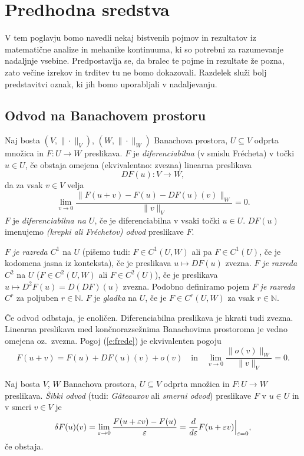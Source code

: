 \chapter{Predhodna sredstva}


V tem poglavju bomo navedli nekaj bistvenih pojmov in rezultatov iz matematične analize
in mehanike kontinuuma, ki so potrebni za razumevanje nadaljnje vsebine. Predpostavlja
se, da bralec te pojme in rezultate že pozna, zato večine izrekov in trditev
tu ne bomo dokazovali. Razdelek služi bolj predstavitvi oznak, ki jih
bomo uporabljali v nadaljevanju.


\section{Odvod na Banachovem prostoru}


\begin{definicija}
	Naj bosta $(V,\|\cdot\|_V)$, $(W,\|\cdot\|_W)$ Banachova prostora, $U\subseteq V$ odprta
	množica in $F\colon U\to W$ preslikava. $F$ je \emph{diferenciabilna} (v smislu Frécheta)
	v točki $u\in U$, če obstaja omejena (ekvivalentno: zvezna) linearna preslikava
	\[ DF(u)\colon V\to W, \]
	da za vsak $v\in V$ velja
	\begin{equation} \label{e:frede}
		\lim_{v\to 0}\frac{\|F(u+v)-F(u)-DF(u)(v)\|_W}{\|v\|_V}=0.
	\end{equation}
	$F$ je \emph{diferenciabilna na $U$}, če je diferenciabilna v vsaki točki $u\in U$.
	$DF(u)$ imenujemo \emph{(krepki ali Fréchetov) odvod} preslikave $F$.
	
	$F$ \emph{je razreda $C^1$} na $U$ (pišemo tudi: $F\in C^1(U,W)$ ali pa $F\in C^1(U)$,
	če je kodomena jasna iz konteksta), če je preslikava $u\mapsto DF(u)$ zvezna.
	$F$ \emph{je razreda $C^2$} na $U$ ($F\in C^2(U,W)$ ali $F\in C^2(U)$),
	če je preslikava $u\mapsto D^2F(u)=D(DF)(u)$ zvezna. Podobno definiramo pojem
	$F$ \emph{je razreda $C^r$} za poljuben $r\in\mathbb{N}$. $F$ je \emph{gladka} na $U$,
	če je $F\in C^r(U,W)$ za vsak $r\in\mathbb{N}$.
\end{definicija}

Če odvod odbstaja, je enoličen. Diferenciabilna preslikava je hkrati tudi zvezna.
Linearna preslikava med končnorazsežnima Banachovima prostoroma je vedno omejena
oz.~zvezna. Pogoj (\ref{e:frede}) je ekvivalenten pogoju
\[
	F(u+v)=F(u)+DF(u)(v)+o(v)\quad\textrm{in}\quad
	\lim_{v\to 0}\frac{\|o(v)\|_W}{\|v\|_V}=0.
\]

\begin{definicija}
	Naj bosta $V$, $W$ Banachova prostora, $U\subseteq V$ odprta
	množica in $F\colon U\to W$ preslikava. \emph{Šibki odvod} (tudi: \emph{Gâteauxov} ali
	\emph{smerni odvod}) preslikave $F$ v $u\in U$ in v smeri $v\in V$ je
	\[
		\delta F(u)(v) =
		\lim_{\varepsilon\to 0}\frac{F(u+\varepsilon v)-F(u)}{\varepsilon}
		=\frac{d}{d\varepsilon}F(u+\varepsilon v)\Big|_{\varepsilon = 0},
	\]
	če obstaja.
\end{definicija}

